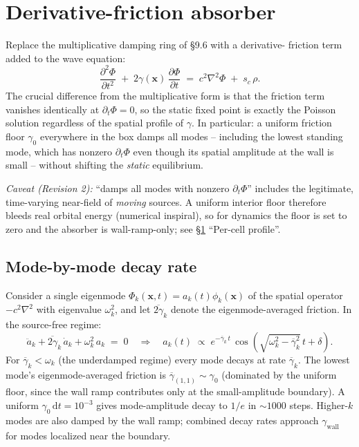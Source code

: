 \documentclass[11pt,a4paper]{article}
\newcommand{\vv}[1]{\mathbf{#1}}
\newcommand{\dd}{\mathrm{d}}
\begin{document}
\section{Derivative-friction absorber}
\label{sec:friction}

Replace the multiplicative damping ring of \S 9.6 with a derivative-
friction term added to the wave equation:
\begin{equation}
  \frac{\partial^2 \Phi}{\partial t^2} \;+\; 2\gamma(\vv{x})\,\frac{\partial \Phi}{\partial t}
  \;=\; c^2\nabla^2 \Phi \;+\; s_c\,\rho.
  \label{eq:friction_pde}
\end{equation}
The crucial difference from the multiplicative form is that the
friction term vanishes identically at $\partial_t \Phi = 0$, so the
static fixed point is exactly the Poisson solution regardless of the
spatial profile of $\gamma$.  In particular: a uniform friction floor
$\gamma_0$ everywhere in the box damps all modes -- including the
lowest standing mode, which has nonzero $\partial_t \Phi$ even though
its spatial amplitude at the wall is small -- without shifting the
\emph{static} equilibrium.

\emph{Caveat (Revision 2):} ``damps all modes with nonzero
$\partial_t\Phi$'' includes the legitimate, time-varying near-field of
\emph{moving} sources.  A uniform interior floor therefore bleeds real
orbital energy (numerical inspiral), so for dynamics the floor is set
to zero and the absorber is wall-ramp-only; see \S\ref{sec:friction}
``Per-cell profile''.

\subsection{Mode-by-mode decay rate}

Consider a single eigenmode $\Phi_k(\vv{x},t) = a_k(t)\phi_k(\vv{x})$
of the spatial operator $-c^2\nabla^2$ with eigenvalue $\omega_k^2$,
and let $\overline{2\gamma}_k$ denote the eigenmode-averaged
friction.  In the source-free regime:
\begin{equation}
  \ddot a_k + \overline{2\gamma}_k\,\dot a_k + \omega_k^2\,a_k \;=\; 0
  \quad\Longrightarrow\quad
  a_k(t) \;\propto\; e^{-\overline{\gamma}_k\,t}\,\cos(\sqrt{\omega_k^2 - \overline{\gamma}_k^2}\,t + \delta).
\end{equation}
For $\overline{\gamma}_k < \omega_k$ (the underdamped regime) every
mode decays at rate $\overline{\gamma}_k$.  The lowest mode's
eigenmode-averaged friction is
$\overline{\gamma}_{(1,1)} \sim \gamma_0$ (dominated by the uniform
floor, since the wall ramp contributes only at the small-amplitude
boundary).  A uniform $\gamma_0\,\dd t = 10^{-3}$ gives mode-amplitude
decay to $1/e$ in $\sim 1000$ steps.  Higher-$k$ modes are also
damped by the wall ramp; combined decay rates approach $\gamma_\text{wall}$
for modes localized near the boundary.
\end{document}
